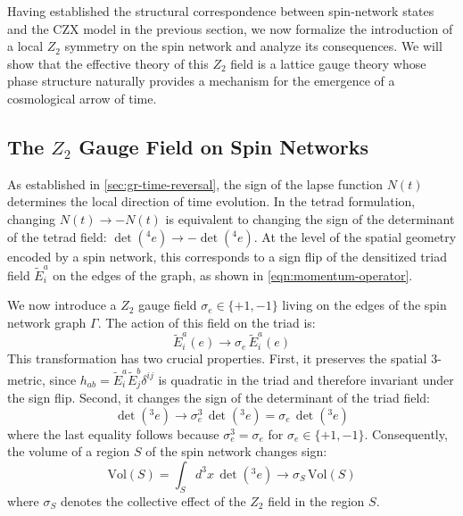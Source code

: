 
Having established the structural correspondence between spin-network states and the CZX model in the previous section, we now formalize the introduction of a local $ Z_2 $ symmetry on the spin network and analyze its consequences. We will show that the effective theory of this $ Z_2 $ field is a lattice gauge theory whose phase structure naturally provides a mechanism for the emergence of a cosmological arrow of time.

\subsection{The $ Z_2 $ Gauge Field on Spin Networks}\label{subsec:z2-definition}

As established in \autoref{sec:gr-time-reversal}, the sign of the lapse function $ N(t) $ determines the local direction of time evolution. In the tetrad formulation, changing $ N(t) \rightarrow -N(t) $ is equivalent to changing the sign of the determinant of the tetrad field: $ \det({}^4 e) \rightarrow -\det({}^4 e) $. At the level of the spatial geometry encoded by a spin network, this corresponds to a sign flip of the densitized triad field $ \tilde E^a_i $ on the edges of the graph, as shown in \eqref{eqn:momentum-operator}.

We now introduce a $ Z_2 $ gauge field $ \sigma_e \in \{+1, -1\} $ living on the edges of the spin network graph $ \Gamma $. The action of this field on the triad is:
\begin{equation}\label{eqn:z2-triad-action}
	\tilde E^a_i(e) \rightarrow \sigma_e \, \tilde E^a_i(e)
\end{equation}
This transformation has two crucial properties. First, it preserves the spatial 3-metric, since $ h_{ab} = \tilde E^a_i \tilde E^b_j \delta^{ij} $ is quadratic in the triad and therefore invariant under the sign flip. Second, it changes the sign of the determinant of the triad field:
\begin{equation}\label{eqn:z2-det-flip}
	\det({}^3 e) \rightarrow \sigma_e^3 \, \det({}^3 e) = \sigma_e \, \det({}^3 e)
\end{equation}
where the last equality follows because $ \sigma_e^3 = \sigma_e $ for $ \sigma_e \in \{+1, -1\} $. Consequently, the volume of a region $ S $ of the spin network changes sign:
\begin{equation}\label{eqn:z2-volume-flip}
	\text{Vol}(S) = \int_S d^3 x \, \det({}^3 e) \rightarrow \sigma_S \, \text{Vol}(S)
\end{equation}
where $ \sigma_S $ denotes the collective effect of the $ Z_2 $ field in the region $ S $.

